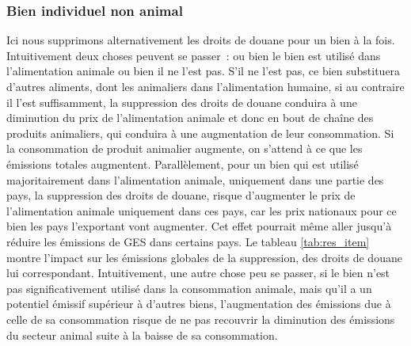 \subsubsection{Bien individuel non animal}

Ici nous supprimons alternativement les droits de douane pour un bien à la fois. Intuitivement deux choses peuvent se passer~: ou bien le bien est utilisé dans l'alimentation animale ou bien il ne l'est pas. S'il ne l'est pas, ce bien substituera d'autres aliments, dont les animaliers dans l'alimentation humaine, si au contraire il l'est suffisamment, la suppression des droits de douane conduira à une diminution du prix de l'alimentation animale et donc en bout de chaîne des produits animaliers, qui conduira à une augmentation de leur consommation. Si la consommation de produit animalier augmente, on s'attend à ce que les émissions totales augmentent. Parallèlement, pour un bien qui est utilisé majoritairement dans l'alimentation animale, uniquement dans une partie des pays, la suppression des droits de douane, risque d'augmenter le prix de l'alimentation animale uniquement dans ces pays, car les prix nationaux pour ce bien les pays l'exportant vont augmenter. Cet effet pourrait même aller jusqu'à réduire les émissions de GES dans certains pays. Le tableau \ref{tab:res_item} montre l'impact sur les émissions globales de la suppression, des droits de douane lui correspondant. Intuitivement, une autre chose peu se passer, si le bien n'est pas significativement utilisé dans la consommation animale, mais qu'il a un potentiel émissif supérieur à d'autres biens, l'augmentation des émissions due à celle de sa consommation risque de ne pas recouvrir la diminution des émissions du secteur animal suite à la baisse de sa consommation.

